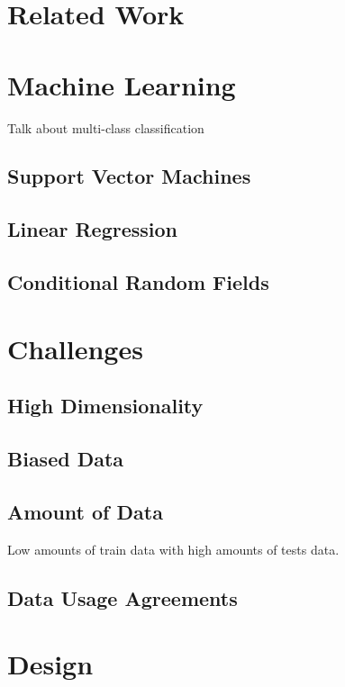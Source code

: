 \documentclass[preprint]{style}
\begin{document}
\section{Related Work}

\section{Machine Learning}

Talk about multi-class classification

\subsection{Support Vector Machines}

\subsection{Linear Regression}

\subsection{Conditional Random Fields}

\section{Challenges}

\subsection{High Dimensionality}

\subsection{Biased Data}

\subsection{Amount of Data}

Low amounts of train data with high amounts of tests data.

\subsection{Data Usage Agreements}

\section{Design}
\end{document}

